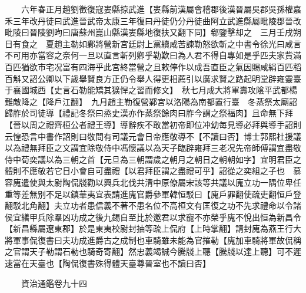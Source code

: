 　　六年春正月趙劉徵復寇婁縣掠武進【婁縣前漢屬會稽郡後漢晉屬吳郡吳孫權嘉禾三年改丹徒曰武進晉武帝太康三年復曰丹徒仍分丹徒曲阿立武進縣屬毗陵郡晉改毗陵曰晉陵劉昫曰唐蘇州崑山縣漢婁縣地復扶又翻下同】郗鑒擊却之　三月壬戌朔日有食之　夏趙主勒如鄴將營新宮廷尉上黨續咸苦諫勒怒欲斬之中書令徐光曰咸言不可用亦當容之奈何一旦以直言斬列卿乎勒歎曰為人君不得自專如是乎匹夫家貲滿百匹猶欲市宅况富有四海乎此宮終當營之且敕停作以成吾直臣之氣因賜咸絹百匹稻百斛又詔公卿以下歲舉賢良方正仍令舉人得更相薦引以廣求賢之路起明堂辟雍靈臺于襄國城西【史言石勒能矯其獷悍之習而修文】　秋七月成大將軍壽攻隂平武都楊難敵降之【降戶江翻】　九月趙主勒復營鄴宮以洛陽為南都置行臺　冬蒸祭太廟詔歸胙於司徒導【禮記冬祭曰烝史漢亦作蒸祭餘肉曰胙今謂之祭福肉】且命無下拜【晉以周之禮齊桓公者禮王導】導辭疾不敢當初帝即位冲幼每見導必拜與導手詔則云惶恐言中書作詔則曰敬問有司議元會日帝應敬導不【不讀曰否】博士郭熙杜援議以為禮無拜臣之文謂宜除敬侍中馮懷議以為天子臨辟雍拜三老况先帝師傅謂宜盡敬侍中荀奕議以為三朝之首【元旦為三朝謂歲之朝月之朝日之朝朝如字】宜明君臣之體則不應敬若它日小會自可盡禮【以君拜臣謂之盡禮可乎】詔從之奕組之子也　慕容廆遣使與太尉陶侃牋勸以興兵北伐共清中原僚屬宋該等共議以廆立功一隅位卑任重等差無别不足以鎮華夷宜表請進廆官爵參軍韓恒駁曰【廆戶罪翻使疏吏翻恒戶登翻駁北角翻】夫立功者患信義不著不患名位不高桓文有匡復之功不先求禮命以令諸侯宜繕甲兵除羣凶功成之後九錫自至比於邀君以求寵不亦榮乎廆不悅出恒為新昌令【新昌縣屬遼東郡】於是東夷校尉封抽等疏上侃府【上時掌翻】請封廆為燕王行大將軍事侃復書曰夫功成進爵古之成制也車騎雖未能為官摧勒【廆加車騎將軍故侃稱之官謂天子勒謂石勒也騎奇寄翻】然忠義竭誠今騰牋上聽【騰牋以達上聽】可不遲速當在天臺也【陶侃復書殊得體天臺尊晉室也不讀曰否】

　　資治通鑑卷九十四  
    


 


 



 

 
  







 


　　
　　
　
　
　


　　

　















